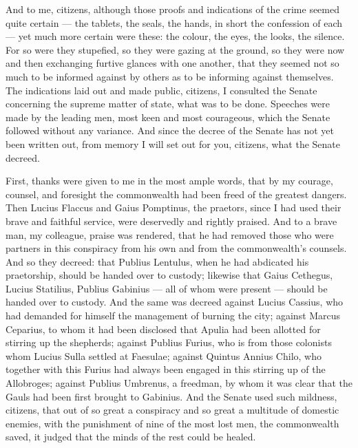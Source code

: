  And to me, citizens, although those proofs and indications of the crime seemed quite certain --- the tablets, the seals, the hands, in short the confession of each --- yet much more certain were these: the colour, the eyes, the looks, the silence. For so were they stupefied, so they were gazing at the ground, so they were now and then exchanging furtive glances with one another, that they seemed not so much to be informed against by others as to be informing against themselves. The indications laid out and made public, citizens, I consulted the Senate concerning the supreme matter of state, what was to be done. Speeches were made by the leading men, most keen and most courageous, which the Senate followed without any variance. And since the decree of the Senate has not yet been written out, from memory I will set out for you, citizens, what the Senate decreed.

 First, thanks were given to me in the most ample words, that by my courage, counsel, and foresight the commonwealth had been freed of the greatest dangers. Then Lucius Flaccus and Gaius Pomptinus, the praetors, since I had used their brave and faithful service, were deservedly and rightly praised. And to a brave man, my colleague, praise was rendered, that he had removed those who were partners in this conspiracy from his own and from the commonwealth's counsels. And so they decreed: that Publius Lentulus, when he had abdicated his praetorship, should be handed over to custody; likewise that Gaius Cethegus, Lucius Statilius, Publius Gabinius --- all of whom were present --- should be handed over to custody. And the same was decreed against Lucius Cassius, who had demanded for himself the management of burning the city; against Marcus Ceparius, to whom it had been disclosed that Apulia had been allotted for stirring up the shepherds; against Publius Furius, who is from those colonists whom Lucius Sulla settled at Faesulae; against Quintus Annius Chilo, who together with this Furius had always been engaged in this stirring up of the Allobroges; against Publius Umbrenus, a freedman, by whom it was clear that the Gauls had been first brought to Gabinius. And the Senate used such mildness, citizens, that out of so great a conspiracy and so great a multitude of domestic enemies, with the punishment of nine of the most lost men, the commonwealth saved, it judged that the minds of the rest could be healed.

